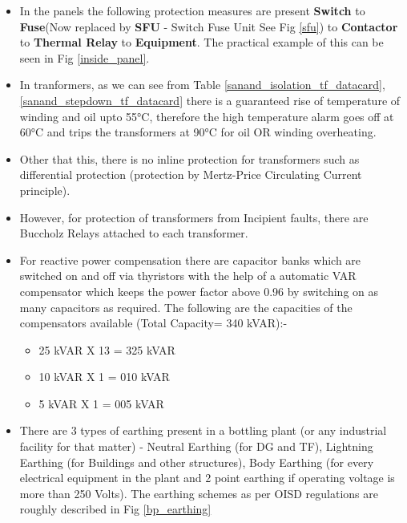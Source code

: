 \documentclass{report}
\begin{document}
	\begin{itemize}
		\item In the panels the following protection measures are present \textbf{Switch} to \textbf{Fuse}(Now replaced by \textbf{SFU} - Switch Fuse Unit See Fig \ref{sfu}) to \textbf{Contactor} to \textbf{Thermal Relay} to \textbf{Equipment}. The practical example of this can be seen in Fig \ref{inside_panel}.
		\item In tranformers, as we can see from Table \ref{sanand_isolation_tf_datacard}, \ref{sanand_stepdown_tf_datacard} there is a guaranteed rise of temperature of winding and oil upto \ang{55}C, therefore the high temperature alarm goes off at \ang{60}C and trips the transformers at \ang{90}C for oil OR winding overheating.
		\item Other that this, there is no inline protection for transformers such as differential protection (protection by Mertz-Price Circulating Current principle).
		\item However, for protection of transformers from Incipient faults, there are Buccholz Relays attached to each transformer. 
		\item For reactive power compensation there are capacitor banks which are switched on and off via thyristors with the help of a automatic VAR compensator which keeps the power factor above 0.96 by switching on as many capacitors as required. The following are the capacities of the compensators available (Total Capacity= 340 kVAR):-
		\begin{itemize}
			\item 25 kVAR X 13 = 325 kVAR
			\item 10 kVAR X 1  = 010 kVAR
			\item 5 kVAR X 1 =   005 kVAR
		\end{itemize}
		\item There are 3 types of earthing present in a bottling plant (or any industrial facility for that matter) - Neutral Earthing (for DG and TF), Lightning Earthing (for Buildings and other structures), Body Earthing (for every electrical equipment in the plant and 2 point earthing if operating voltage is more than 250 Volts). The earthing schemes as per OISD regulations are roughly described in Fig \ref{bp_earthing}
	\end{itemize}
\end{document}
